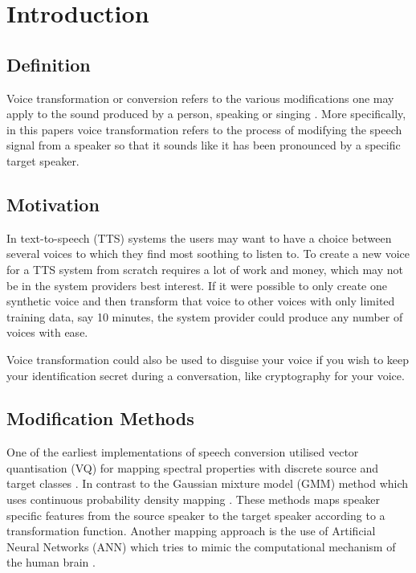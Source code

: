 \chapter{Introduction} %
\label{cha:introduction}
  

\section{Definition} %
\label{sec:definition}
Voice transformation or conversion refers to the various modifications one may apply to the sound produced by a person, speaking or singing \cite{stylianou08}. More specifically, in this papers voice transformation refers to the process of modifying the speech signal from a speaker so that it sounds like it has been pronounced by a specific target speaker. 

\section{Motivation} %
\label{sec:motivation}
In text-to-speech (TTS) systems the users may want to have a choice between several voices to which they find most soothing to listen to. To create a new voice for a TTS system from scratch requires a lot of work and money, which may not be in the system providers best interest. If it were possible to only create one synthetic voice and then transform that voice to other voices with only limited training data, say 10 minutes, the system provider could produce any number of voices with ease. 

Voice transformation could also be used to disguise your voice if you wish to keep your identification secret during a conversation, like cryptography for your voice. 

\section{Modification Methods} %
\label{sec:synthesis_methods}
One of the earliest implementations of speech conversion utilised vector quantisation (VQ) for mapping spectral properties with discrete source and target classes \cite{abe88}. In contrast to the Gaussian mixture model (GMM) method which uses continuous probability density mapping \cite{stylianou98}. These methods maps speaker specific features from the source speaker to the target speaker according to a transformation function. Another mapping approach is the use of Artificial Neural Networks (ANN) \cite{desai09} which tries to mimic the computational mechanism of the human brain \cite{young75}. 

